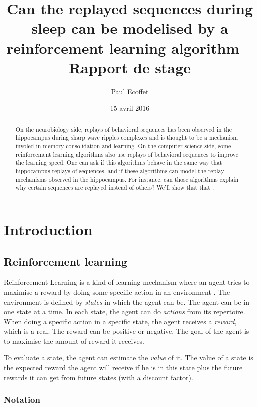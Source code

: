 \documentclass[]{article}
\title{Can the replayed sequences during sleep can be modelised by a reinforcement learning algorithm -- Rapport de stage}
\author{Paul Ecoffet}
\date{15 avril 2016}
\newcommand\bla[1]{\ifthenelse{\isempty{#1}}{\hl{**~bla~bla~**}}{\hl{**~#1~**}}}
\begin{document}
\maketitle

\begin{abstract}
On the neurobiology side, replays of behavioral sequences has been observed in the hippocampus during sharp wave ripples complexes and is thought to be a mechanism involed in memory consolidation and learning. On the computer science side, some reinforcement learning algorithms also use replays of behavioral sequences to improve the learning speed. One can ask if this algorithms behave in the same way that hippocampus replays of sequences, and if these algorithms can model the replay mechanisms observed in the hippocampus. For instance, can those algorithms explain why certain sequences are replayed instead of others? We'll show that that \bla{we'll see}.
\end{abstract}

{
\hypersetup{linkcolor=black}
\setcounter{tocdepth}{3}
}
\section{Introduction}\label{introduction}

\subsection{Reinforcement learning}\label{reinforcement-learning}

Reinforcement Learning is a kind of learning mechanism where an agent tries to maximise a reward by doing some specific action in an environment \parencite{sutton_reinforcement_1998}. The environment is defined by \emph{states} in which the agent can be. The agent can be in one state at a time. In each state, the agent can do \emph{actions} from its repertoire. When doing a specific action in a specific state, the agent receives a \emph{reward}, which is a real. The reward can be positive or negative. The goal of the agent is to maximise the amount of reward it receives.

To evaluate a state, the agent can estimate the \emph{value} of it. The value of a state is the expected reward the agent will receive if he is in this state plus the future rewards it can get from future states (with a discount factor).

\subsubsection{Notation}
\end{document}
